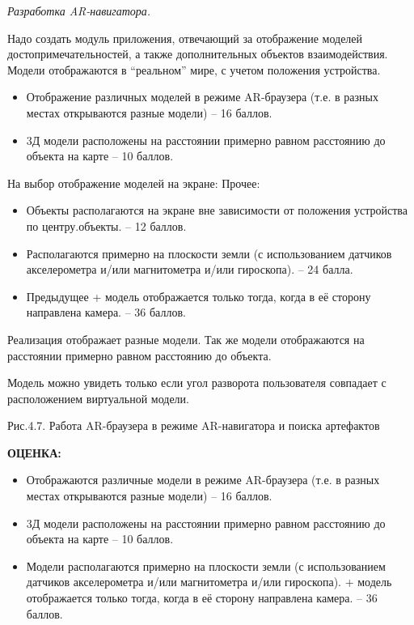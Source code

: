 \textit{Разработка AR-навигатора.}

Надо создать модуль приложения, отвечающий за отображение моделей достопримечательностей, а также дополнительных объектов взаимодействия. Модели отображаются в “реальном” мире, с учетом положения устройства.

\markSection
\begin{itemize}
    \item	Отображение различных моделей в режиме AR-браузера (т.е. в разных местах открываются разные модели) – 16 баллов.
    \item	3Д модели расположены на расстоянии примерно равном расстоянию до объекта на карте – 10 баллов.
\end{itemize}

На выбор отображение моделей на экране:
Прочее:
\begin{itemize}
    \item	Объекты располагаются на экране вне зависимости от положения устройства по центру.объекты. – 12 баллов.
    \item	Располагаются примерно на плоскости земли (с использованием датчиков акселерометра и/или магнитометра и/или гироскопа). – 24 балла.
    \item	Предыдущее + модель отображается только тогда, когда в её сторону направлена камера. – 36 баллов.
\end{itemize}

\solutionSection
Реализация отображает разные модели. Так же модели отображаются на расстоянии примерно равном расстоянию до объекта. 

Модель можно увидеть только если угол разворота пользователя совпадает с расположением виртуальной модели.


\begin{center}
    Рис.4.7. Работа AR-браузера в режиме AR-навигатора и поиска артефактов
\end{center}

\textbf{ОЦЕНКА:}
\begin{itemize}
    \item	Отображаются различные модели в режиме AR-браузера (т.е. в разных местах открываются разные модели) – 16 баллов.
    \item	3Д модели расположены на расстоянии примерно равном расстоянию до объекта на карте – 10 баллов.
    \item	Модели располагаются примерно на плоскости земли (с использованием датчиков акселерометра и/или магнитометра и/или гироскопа). + модель отображается только тогда, когда в её сторону направлена камера. – 36 баллов.
\end{itemize}

\inputminted[fontsize=\footnotesize, linenos]{csharp}{final/command_tour/ar/task_05_1/source_1.cs}

\inputminted[fontsize=\footnotesize, linenos]{csharp}{final/command_tour/ar/task_05_1/source_2.cs}